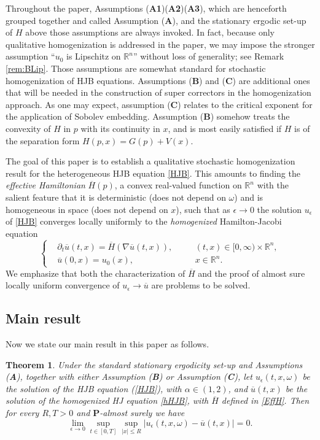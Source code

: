 \documentclass[11pt,reqno]{amsart}
\newtheorem{thm}{Theorem}[section]
\theoremstyle{definition}
\theoremstyle{remark}
\numberwithin{equation}{section}
\def\bP{\mathbf{P}}
\newcommand{\eps}{\epsilon}
\newcommand{\R}{{\mathbb{R}}}
\newcommand{\ol}{\overline}
\begin{document}
Throughout the paper, Assumptions ({\bf A1})({\bf A2})({\bf A3}), which are henceforth grouped together and called Assumption ({\bf A}), and the stationary ergodic set-up of $H$ above those assumptions are always invoked. In fact, because only qualitative homogenization is addressed in the paper, we may impose the stronger assumption ``$u_0$ is Lipschitz on $\R^n$'' without loss of generality; see Remark \ref{rem:BLip}. Those assumptions are somewhat standard for stochastic homogenization of HJB equations. 
Assumptions ({\bf B}) and ({\bf C}) are additional ones that will be needed in the construction of super correctors in the homogenization approach. As one may expect, assumption ({\bf C}) relates to the critical exponent for the application of Sobolev embedding. Assumption ({\bf B}) somehow treats the convexity of $H$ in $p$ with its continuity in $x$, and is most easily satisfied if $H$ is of the separation form $H(p,x)=G(p)+V(x)$.

The goal of this paper is to establish a qualitative stochastic homogenization result for the heterogeneous HJB equation \eqref{HJB}. This amounts to finding the \emph{effective Hamiltonian} $\overline{H}(p)$, a convex real-valued function on $\mathbb{R}^n$ with the salient feature that it is deterministic (does not depend on $\omega$) and is homogeneous in space (does not depend on $x$), such that as $\eps\to 0$ the solution $u_\eps$ of \eqref{HJB} converges locally uniformly to the \emph{homogenized} Hamilton-Jacobi equation
\begin{equation}\label{hHJB}
  \left\{
   \begin{aligned}
   & \partial_t \overline{u}(t,x) =  \overline{H}(\nabla \overline{u}(t,x)),\quad & &(t,x) \in [0,\infty)\times\mathbb{R}^n, \\
   &  \overline{u}(0,x) = u_0(x), \quad & &x\in \mathbb{R}^n.
   \end{aligned}
   \right.
\end{equation}
We emphasize that both the characterization of $\overline{H}$ and the proof of almost sure locally uniform convergence of $u_\eps \to \ol{u}$ are problems to be solved. %

\subsection{Main result} Now we state our main result in this paper as follows.
\begin{thm}
\label{thm:main}
Under the standard stationary ergodicity set-up and Assumptions {\upshape({\bf A})}, together with either Assumption {\upshape({\bf B})} or Assumption {\upshape({\bf C})}, let $u_{\epsilon}(t,x,\omega)$ be the solution of the HJB equation (\ref{HJB}), with $\alpha\in (1,2)$, and $\overline u(t,x)$ be the solution of the homogenized HJ equation \eqref{hHJB}, with $\ol{H}$ defined in \eqref{EffH}. Then for every $R,T>0$ and $\bP$-almost surely we have
\begin{equation}\label{eq:main}
    \lim_{\epsilon\rightarrow 0}\sup_{t\in[0,T]}\sup_{|x|\leq R}|u_{\epsilon}(t,x,\omega) - \overline u(t,x)|= 0 .
\end{equation}
\end{thm}
\end{document}
